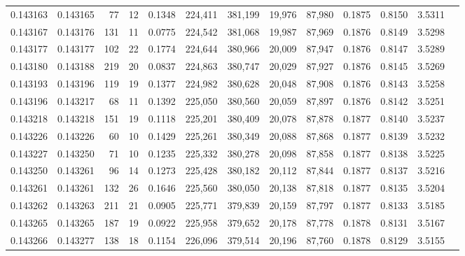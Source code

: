 \begin{tabular}{rrrrrrrrrrrrr}
0.143163 & 0.143165 &    77 &  12 &                                     0.1348 & 224,411 & 381,199 &  19,976 &  87,980 & 0.1875 & 0.8150 & 3.5311 \\
0.143167 & 0.143176 &   131 &  11 &                                     0.0775 & 224,542 & 381,068 &  19,987 &  87,969 & 0.1876 & 0.8149 & 3.5298 \\
0.143177 & 0.143177 &   102 &  22 &                                     0.1774 & 224,644 & 380,966 &  20,009 &  87,947 & 0.1876 & 0.8147 & 3.5289 \\
0.143180 & 0.143188 &   219 &  20 &                                     0.0837 & 224,863 & 380,747 &  20,029 &  87,927 & 0.1876 & 0.8145 & 3.5269 \\
0.143193 & 0.143196 &   119 &  19 &                                     0.1377 & 224,982 & 380,628 &  20,048 &  87,908 & 0.1876 & 0.8143 & 3.5258 \\
0.143196 & 0.143217 &    68 &  11 &                                     0.1392 & 225,050 & 380,560 &  20,059 &  87,897 & 0.1876 & 0.8142 & 3.5251 \\
0.143218 & 0.143218 &   151 &  19 &                                     0.1118 & 225,201 & 380,409 &  20,078 &  87,878 & 0.1877 & 0.8140 & 3.5237 \\
0.143226 & 0.143226 &    60 &  10 &                                     0.1429 & 225,261 & 380,349 &  20,088 &  87,868 & 0.1877 & 0.8139 & 3.5232 \\
0.143227 & 0.143250 &    71 &  10 &                                     0.1235 & 225,332 & 380,278 &  20,098 &  87,858 & 0.1877 & 0.8138 & 3.5225 \\
0.143250 & 0.143261 &    96 &  14 &                                     0.1273 & 225,428 & 380,182 &  20,112 &  87,844 & 0.1877 & 0.8137 & 3.5216 \\
0.143261 & 0.143261 &   132 &  26 &                                     0.1646 & 225,560 & 380,050 &  20,138 &  87,818 & 0.1877 & 0.8135 & 3.5204 \\
0.143262 & 0.143263 &   211 &  21 &                                     0.0905 & 225,771 & 379,839 &  20,159 &  87,797 & 0.1877 & 0.8133 & 3.5185 \\
0.143265 & 0.143265 &   187 &  19 &                                     0.0922 & 225,958 & 379,652 &  20,178 &  87,778 & 0.1878 & 0.8131 & 3.5167 \\
0.143266 & 0.143277 &   138 &  18 &                                     0.1154 & 226,096 & 379,514 &  20,196 &  87,760 & 0.1878 & 0.8129 & 3.5155 \\

\end{tabular}
